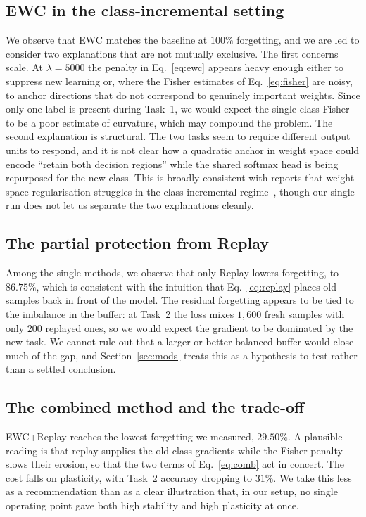 \documentclass[11pt]{article}
\begin{document}
\subsection{EWC in the class-incremental setting}
We observe that EWC matches the baseline at $100\%$ forgetting, and we are led to
consider two explanations that are not mutually exclusive. The first concerns
scale. At $\lambda{=}5000$ the penalty in Eq.~\eqref{eq:ewc} appears heavy enough
either to suppress new learning or, where the Fisher estimates of
Eq.~\eqref{eq:fisher} are noisy, to anchor directions that do not correspond to
genuinely important weights. Since only one label is present during Task~1, we
would expect the single-class Fisher to be a poor estimate of curvature, which
may compound the problem. The second explanation is structural. The two tasks
seem to require different output units to respond, and it is not clear how a
quadratic anchor in weight space could encode ``retain both decision regions''
while the shared softmax head is being repurposed for the new class. This is
broadly consistent with reports that weight-space regularisation struggles in the
class-incremental regime~\cite{delange2021survey}, though our single run does not
let us separate the two explanations cleanly.

\subsection{The partial protection from Replay}
Among the single methods, we observe that only Replay lowers forgetting, to
$86.75\%$, which is consistent with the intuition that Eq.~\eqref{eq:replay}
places old samples back in front of the model. The residual forgetting appears to
be tied to the imbalance in the buffer: at Task~2 the loss mixes $1{,}600$ fresh
samples with only $200$ replayed ones, so we would expect the gradient to be
dominated by the new task. We cannot rule out that a larger or better-balanced
buffer would close much of the gap, and Section~\ref{sec:mods} treats this as a
hypothesis to test rather than a settled conclusion.

\subsection{The combined method and the trade-off}
EWC+Replay reaches the lowest forgetting we measured, $29.50\%$. A plausible
reading is that replay supplies the old-class gradients while the Fisher penalty
slows their erosion, so that the two terms of Eq.~\eqref{eq:comb} act in concert.
The cost falls on plasticity, with Task~2 accuracy dropping to $31\%$. We take
this less as a recommendation than as a clear illustration that, in our setup, no
single operating point gave both high stability and high plasticity at once.
\end{document}
